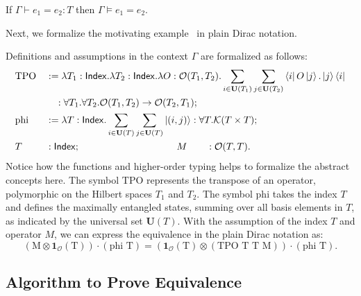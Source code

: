 \begin{lemma}\label{lem: axiom sound}
If \( \Gamma \vdash e_1 = e_2 :T \) then \( \Gamma \vDash e_1 = e_2\).
\end{lemma}
Next, we formalize the motivating example~ in
plain Dirac notation.
\begin{example}
    \label{ex: formalizing motivating}
    Definitions and assumptions in the context \( \Gamma \) are formalized as follows:
    \begin{align*}
        & \text{TPO} && := \lambda T_1 : \mathsf{Index}. \lambda T_2 : \mathsf{Index}. \lambda O : \mathcal{O}(T_1, T_2). \sum_{i \in \mathbf{U}(T_1)} \sum_{j \in \mathbf{U}(T_2)} \bra{i} O \ket{j} . \ket{j}\bra{i} \\
        & &&\quad : \forall T_1. \forall T_2. \mathcal{O}(T_1, T_2) \to \mathcal{O}(T_2, T_1); \\
        &\text{phi} &&:= \lambda T : \mathsf{Index}. \sum_{i \in \mathbf{U}(T)} \sum_{j \in \mathbf{U}(T)} \ket{(i, j)} : \forall T.\mathcal{K}(T \times T); \\
        & T && : \mathsf{Index};  \qquad \qquad \qquad \qquad \qquad M \qquad : \mathcal{O}(T, T).
    \end{align*}
    Notice how the functions and higher-order typing helps to formalize the abstract concepts here.
    The symbol \( \text{TPO} \) represents the transpose of an operator, polymorphic on the Hilbert spaces \( T_1 \) and \( T_2 \). 
    The symbol \( \text{phi} \) takes the index \( T \) and defines the maximally entangled states, summing over all basis elements in \( T \), as indicated by the universal set \( \mathbf{U}(T) \).
    With the assumption of the index \( T \) and operator \( M \), we can express the equivalence in the plain Dirac notation as:
    \[
    (\textrm{M} \otimes \mathbf{1}_\mathcal{O}(\textrm{T})) \cdot (\textrm{phi T}) = (\mathbf{1}_\mathcal{O}(\textrm{T}) \otimes (\textrm{TPO T T M})) \cdot (\textrm{phi T}).
    \]
\end{example}



\subsection{Algorithm to Prove Equivalence}

